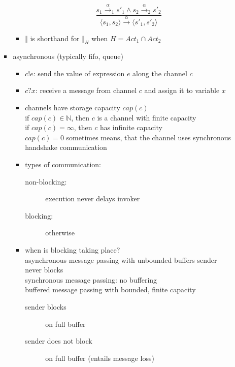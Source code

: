 \documentclass[a4paper, 10pt]{article}
\begin{document}
\begin{itemize}
\begin{itemize}
\begin{itemize}
\begin{shaded}
\begin{itemize}
                    \[
                    \frac{
                    s_1 \overset{\alpha}{\longrightarrow}_1 s'_1 \wedge s_2 \overset{\alpha}{\longrightarrow}_2 s'_2
                    }{
                    \langle s_1,s_2 \rangle \overset{\alpha}{\longrightarrow} \langle s'_1,s'_2 \rangle
                    }
                    \]
                    \item $\Vert$ is shorthand for $\Vert_H$ when $H=Act_1\cap Act_2$
                \end{itemize}
            \end{shaded}
            \item asynchronous (typically fifo, queue)
            \begin{itemize}
                \item $c!e$: send the value of expression $e$ along the channel $c$
                \item $c?x$: receive a message from channel $c$ and assign it to variable $x$
                \item channels have storage capacity $cap(c)$
                    \\ if $cap(c)\in\mathbb{N}$, then $c$ is a channel with finite capacity
                    \\ if $cap(c)=\infty$, then $c$ has infinite capacity
                    \\ $cap(c)=0$ sometimes means, that the channel uses synchronous handshake communication
                \item types of communication:
                \begin{description}
                    \item[non-blocking:] execution never delays invoker
                    \item[blocking:] otherwise
                \end{description}
                \item when is blocking taking place?
                    \\ asynchronous message passing with unbounded buffers \follows sender never blocks
                    \\ synchronous message passing: no buffering
                    \\ buffered message passing with bounded, finite capacity
                    \begin{description}
                        \item[sender blocks] on full buffer
                        \item[sender does not block] on full buffer (entails message loss)
                    \end{description}
            \end{itemize}
        \end{itemize}
    \end{itemize}
\end{itemize}
\end{document}
